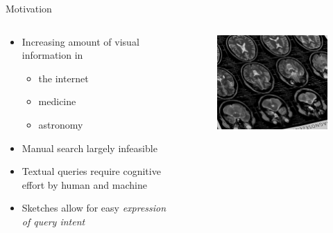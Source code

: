 \documentclass[mathserif]{beamer}
\begin{document}
\begin{frame}{Motivation}
    \begin{columns}
        \begin{column}{.5\textwidth}
            \begin{itemize}
                \item Increasing amount of visual information in
                    \begin{itemize}
                        \item the internet
                        \item medicine
                        \item astronomy
                    \end{itemize}
                \item Manual search largely infeasible
                \item Textual queries require cognitive effort by human and machine
                \item Sketches allow for easy \emph{expression of query intent}
            \end{itemize}
        \end{column}
        \begin{column}{.5\textwidth}
            \begin{figure}
                \includegraphics[width=.9\textwidth]{illustrations/medical_image}
            \end{figure}
        \end{column}
    \end{columns}
\end{frame}
\end{document}
